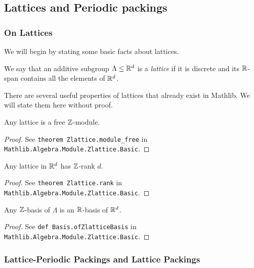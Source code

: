 \subsection{Lattices and Periodic packings}

\subsubsection{On Lattices}

We will begin by stating some basic facts about lattices.

\begin{definition}\label{IsZlattice}\leanok
  We say that an additive subgroup $\Lambda \leq \mathbb{R}^d$ is a \emph{lattice} if it is discrete and its $\mathbb{R}$-span contains all the elements of $\mathbb{R}^d$.
\end{definition}

There are several useful properties of lattices that already exist in Mathlib. We will state them here without proof.

\begin{lemma}\label{Zlattice.module_free}\leanok
  Any lattice is a free $\mathbb{Z}$-module.
\end{lemma}
\begin{proof}\leanok
  See \verb|theorem Zlattice.module_free| in \verb|Mathlib.Algebra.Module.Zlattice.Basic|.
\end{proof}

\begin{lemma}\label{Zlattice.rank}\leanok
  Any lattice in $\mathbb{R}^d$ has $\mathbb{Z}$-rank $d$.
\end{lemma}
\begin{proof}
  See \verb|theorem Zlattice.rank| in \verb|Mathlib.Algebra.Module.Zlattice.Basic|.
\end{proof}

\begin{lemma}\label{Basis.ofZlatticeBasis}\leanok
  Any $\mathbb{Z}$-basis of $\Lambda$ is an $\mathbb{R}$-basis of $\mathbb{R}^d$.
\end{lemma}
\begin{proof}\leanok
  See \verb|def Basis.ofZlatticeBasis| in \verb|Mathlib.Algebra.Module.Zlattice.Basic|.
\end{proof}

\subsubsection{Lattice-Periodic Packings and Lattice Packings}

